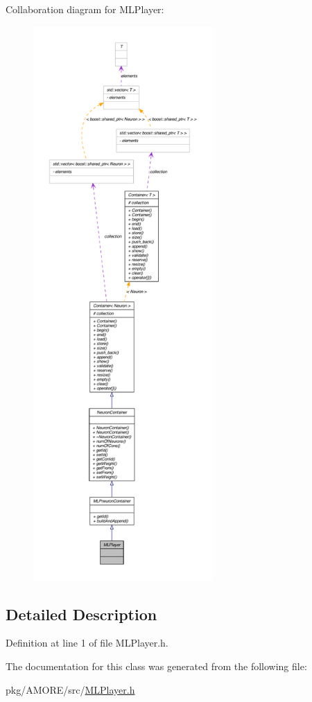 Collaboration diagram for MLPlayer:\nopagebreak
\begin{figure}[H]
\begin{center}
\leavevmode
\includegraphics[height=600pt]{class_m_l_player__coll__graph}
\end{center}
\end{figure}


\subsection{Detailed Description}


Definition at line 1 of file MLPlayer.h.



The documentation for this class was generated from the following file:\begin{DoxyCompactItemize}
\item 
pkg/AMORE/src/\hyperlink{_m_l_player_8h}{MLPlayer.h}\end{DoxyCompactItemize}
